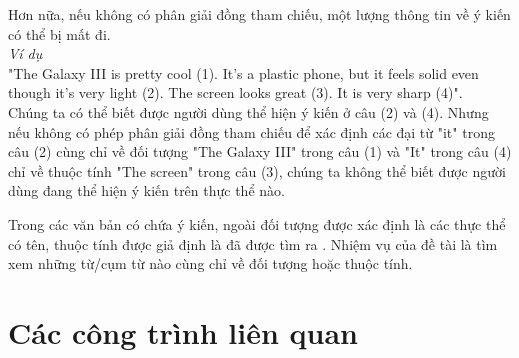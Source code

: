 \documentclass[12pt]{extarticle}
\begin{document}
		\par Hơn nữa, nếu không có phân giải đồng tham chiếu, một lượng thông tin về ý kiến có thể bị mất đi.\\
		\textit{Ví dụ}\\
		"The Galaxy III is pretty cool (1). It's a plastic phone, but it feels solid even though it's very light (2). The screen looks great (3). It is very sharp (4)".
		\\Chúng ta có thể biết được người dùng thể hiện ý kiến ở câu (2) và (4). Nhưng nếu không có phép phân giải đồng tham chiếu để xác định các đại từ "it" trong câu (2) cùng chỉ về đối tượng "The Galaxy III" trong câu (1) và "It" trong câu (4) chỉ về thuộc tính "The screen" trong câu (3), chúng ta không thể biết được người dùng đang thể hiện ý kiến trên thực thể nào.
		\par Trong các văn bản có chứa ý kiến, ngoài đối tượng được xác định là các thực thể có tên, thuộc tính được giả định là đã được tìm ra \cite{findfeatures1} \cite{findfeatures2}. Nhiệm vụ của đề tài là tìm xem những từ/cụm từ nào cùng chỉ về đối tượng hoặc thuộc tính.			

	\section{Các công trình liên quan}
\end{document}
